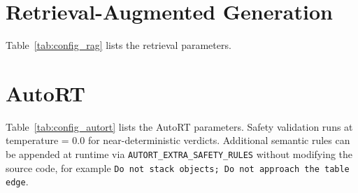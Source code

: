 \section{Retrieval-Augmented Generation}\label{appendix:config:rag}
Table~\ref{tab:config_rag} lists the retrieval parameters.

\begin{table}[t]
	\centering
	\caption{\gls{rag} system configuration parameters.}
	\label{tab:config_rag}
\end{table}

\section{AutoRT}\label{appendix:config:autort}
Table~\ref{tab:config_autort} lists the AutoRT parameters. Safety validation runs at temperature = 0.0 for near-deterministic verdicts. Additional semantic rules can be appended at runtime via \texttt{AUTORT\_EXTRA\_SAFETY\_RULES} without modifying the source code, for example \texttt{Do not stack objects; Do not approach the table edge}.

